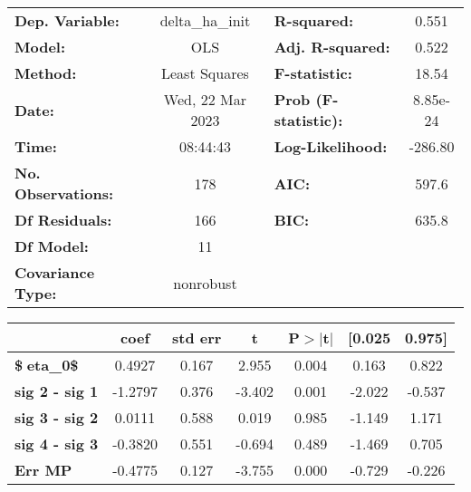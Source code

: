 \begin{center}
\begin{tabular}{lclc}
\toprule
\textbf{Dep. Variable:}    & delta\_ha\_init  & \textbf{  R-squared:         } &    0.551  \\
\textbf{Model:}            &       OLS        & \textbf{  Adj. R-squared:    } &    0.522  \\
\textbf{Method:}           &  Least Squares   & \textbf{  F-statistic:       } &    18.54  \\
\textbf{Date:}             & Wed, 22 Mar 2023 & \textbf{  Prob (F-statistic):} & 8.85e-24  \\
\textbf{Time:}             &     08:44:43     & \textbf{  Log-Likelihood:    } &  -286.80  \\
\textbf{No. Observations:} &         178      & \textbf{  AIC:               } &    597.6  \\
\textbf{Df Residuals:}     &         166      & \textbf{  BIC:               } &    635.8  \\
\textbf{Df Model:}         &          11      & \textbf{                     } &           \\
\textbf{Covariance Type:}  &    nonrobust     & \textbf{                     } &           \\
\bottomrule
\end{tabular}
\end{center}\begin{center}
\begin{tabular}{lcccccc}
\toprule
                                & \textbf{coef} & \textbf{std err} & \textbf{t} & \textbf{P$> |$t$|$} & \textbf{[0.025} & \textbf{0.975]}  \\
\midrule
\textbf{\$eta\_{0}\$}          &       0.4927  &        0.167     &     2.955  &         0.004        &        0.163    &        0.822     \\
\textbf{sig 2 - sig 1}          &      -1.2797  &        0.376     &    -3.402  &         0.001        &       -2.022    &       -0.537     \\
\textbf{sig 3 - sig 2}          &       0.0111  &        0.588     &     0.019  &         0.985        &       -1.149    &        1.171     \\
\textbf{sig 4 - sig 3}          &      -0.3820  &        0.551     &    -0.694  &         0.489        &       -1.469    &        0.705     \\
\textbf{Err MP}                 &      -0.4775  &        0.127     &    -3.755  &         0.000        &       -0.729    &       -0.226     \\

\end{tabular}
\end{center}
